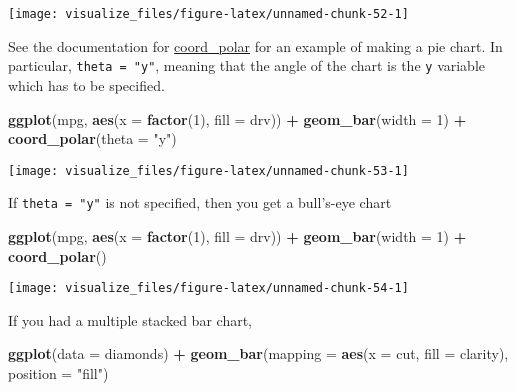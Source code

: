 \documentclass[]{book}
\newenvironment{Shaded}{\begin{snugshade}}{\end{snugshade}}
\newcommand{\DataTypeTok}[1]{\textcolor[rgb]{0.13,0.29,0.53}{#1}}
\newcommand{\DecValTok}[1]{\textcolor[rgb]{0.00,0.00,0.81}{#1}}
\newcommand{\KeywordTok}[1]{\textcolor[rgb]{0.13,0.29,0.53}{\textbf{#1}}}
\newcommand{\NormalTok}[1]{#1}
\newcommand{\OperatorTok}[1]{\textcolor[rgb]{0.81,0.36,0.00}{\textbf{#1}}}
\newcommand{\StringTok}[1]{\textcolor[rgb]{0.31,0.60,0.02}{#1}}
\theoremstyle{plain}
\theoremstyle{remark}
\theoremstyle{definition}
\theoremstyle{definition}
\theoremstyle{definition}
\theoremstyle{remark}
\begin{document}
\begin{center}\texttt{[image: visualize\_files/figure-latex/unnamed-chunk-52-1]} \end{center}

See the documentation for
\href{http://docs.ggplot2.org/current/coord_polar.html}{coord\_polar}
for an example of making a pie chart. In particular,
\texttt{theta\ =\ "y"}, meaning that the angle of the chart is the
\texttt{y} variable which has to be specified.

\begin{Shaded}
\begin{Highlighting}[]
\KeywordTok{ggplot}\NormalTok{(mpg, }\KeywordTok{aes}\NormalTok{(}\DataTypeTok{x =} \KeywordTok{factor}\NormalTok{(}\DecValTok{1}\NormalTok{), }\DataTypeTok{fill =}\NormalTok{ drv)) }\OperatorTok{+}
\StringTok{  }\KeywordTok{geom_bar}\NormalTok{(}\DataTypeTok{width =} \DecValTok{1}\NormalTok{) }\OperatorTok{+}
\StringTok{  }\KeywordTok{coord_polar}\NormalTok{(}\DataTypeTok{theta =} \StringTok{"y"}\NormalTok{)}
\end{Highlighting}
\end{Shaded}

\begin{center}\texttt{[image: visualize\_files/figure-latex/unnamed-chunk-53-1]} \end{center}

If \texttt{theta\ =\ "y"} is not specified, then you get a bull's-eye
chart

\begin{Shaded}
\begin{Highlighting}[]
\KeywordTok{ggplot}\NormalTok{(mpg, }\KeywordTok{aes}\NormalTok{(}\DataTypeTok{x =} \KeywordTok{factor}\NormalTok{(}\DecValTok{1}\NormalTok{), }\DataTypeTok{fill =}\NormalTok{ drv)) }\OperatorTok{+}
\StringTok{  }\KeywordTok{geom_bar}\NormalTok{(}\DataTypeTok{width =} \DecValTok{1}\NormalTok{) }\OperatorTok{+}
\StringTok{  }\KeywordTok{coord_polar}\NormalTok{()}
\end{Highlighting}
\end{Shaded}

\begin{center}\texttt{[image: visualize\_files/figure-latex/unnamed-chunk-54-1]} \end{center}

If you had a multiple stacked bar chart,

\begin{Shaded}
\begin{Highlighting}[]
\KeywordTok{ggplot}\NormalTok{(}\DataTypeTok{data =}\NormalTok{ diamonds) }\OperatorTok{+}
\StringTok{  }\KeywordTok{geom_bar}\NormalTok{(}\DataTypeTok{mapping =} \KeywordTok{aes}\NormalTok{(}\DataTypeTok{x =}\NormalTok{ cut, }\DataTypeTok{fill =}\NormalTok{ clarity), }\DataTypeTok{position =} \StringTok{"fill"}\NormalTok{)}
\end{Highlighting}
\end{Shaded}
\end{document}
